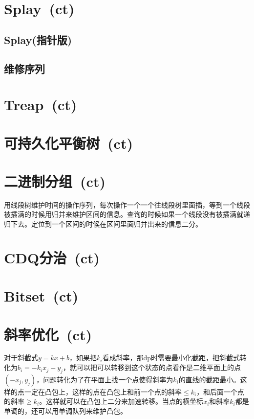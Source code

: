 \section{Splay\ \small(ct)}
    \subsection*{Splay(指针版)}
    \subsection*{维修序列}

\section{Treap\ \small(ct)}

\section{可持久化平衡树\ \small(ct)}

\section{二进制分组\ \small(ct)}
    用线段树维护时间的操作序列，每次操作一个一个往线段树里面插，等到一个线段被插满的时候用归并来维护区间的信息。查询的时候如果一个线段没有被插满就递归下去。定位到一个区间的时候在区间里面归并出来的信息二分。

\section{CDQ分治\ \small(ct)}

\section{Bitset\ \small(ct)}

\section{斜率优化\ \small(ct)}
    对于斜截式$ y = k x + b $，如果把$ k_i $看成斜率，那dp时需要最小化截距，把斜截式转化为$ b_i = - k_i x_j + y_j $，就可以把可以转移到这个状态的点看作是二维平面上的点$ (- x_j, y_j) $，问题转化为了在平面上找一个点使得斜率为$ k_i $的直线的截距最小。这样的点一定在凸包上，这样的点在凸包上和前一个点的斜率$ \leq k_i$，和后面一个点的斜率$ \geq k_i $。这样就可以在凸包上二分来加速转移。当点的横坐标$ x_i $和斜率$ k_i $都是单调的，还可以用单调队列来维护凸包。
